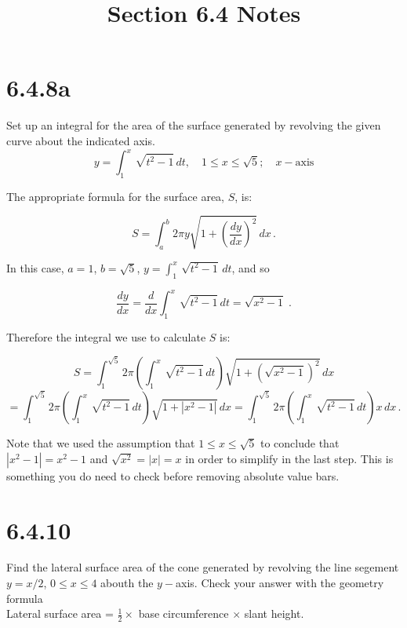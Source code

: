 \documentclass[11pt]{article}
\title{Section 6.4 Notes}
\begin{document}
\maketitle

\section*{6.4.8a}

Set up an integral for the area of the surface generated by revolving the given curve about the indicated axis.\\

$$y = \int_{1}^{x} \, \sqrt{t^2 - 1} \, dt,\quad 1\leq x \leq \sqrt{5}; \quad x - \text{axis} $$

The appropriate formula for the surface area, $S$, is:

$$S = \int_{a}^{b} 2\pi y \sqrt{1 + \left(\frac{dy}{dx}\right)^2} \, dx \,.$$

In this case, $a = 1$, $b = \sqrt{5}$, $y = \int_{1}^{x} \, \sqrt{t^2 - 1} \, dt$, and so

$$\frac{dy}{dx} = \frac{d}{dx} \int_{1}^{x} \, \sqrt{t^2 - 1} \, dt = \sqrt{x^2 - 1} \;.$$

Therefore the integral we use to calculate $S$ is:

$$S = \int_{1}^{\sqrt{5}} 2\pi  \left(\int_{1}^{x} \, \sqrt{t^2 - 1} \, dt\right) \sqrt{1 + \left(\sqrt{x^2 - 1}\right)^2} \, dx$$ $$=\int_{1}^{\sqrt{5}} 2\pi  \left(\int_{1}^{x} \, \sqrt{t^2 - 1} \, dt\right) \sqrt{1 + |x^2 - 1|} \, dx=\int_{1}^{\sqrt{5}} 2\pi  \left(\int_{1}^{x} \, \sqrt{t^2 - 1} \, dt\right) x \, dx\,.$$


Note that we used the assumption that $1\leq x \leq \sqrt{5}$ to conclude that $|x^2-1| = x^2-1$ and $\sqrt{x^2} = |x| = x$ in order to simplify in the last step. This is something you do need to check before removing absolute value bars. 

\section*{6.4.10}

Find the lateral surface area of the cone generated by revolving the line segement $y = x/2$, $0\leq x \leq 4$ abouth the $y-$axis. Check your answer with the geometry formula \\

Lateral surface area = $\frac{1}{2}  \times $ base circumference $\times$ slant height.\\
\end{document}
